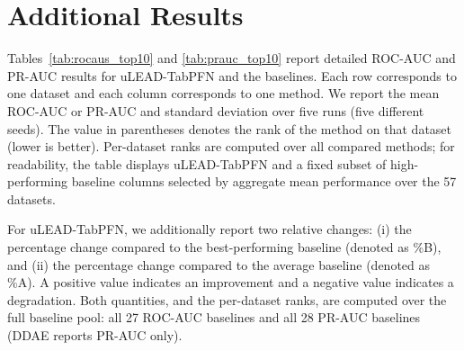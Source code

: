 \documentclass[conference]{IEEEtran}
\begin{document}
	\section{Additional Results}
	\label{app:results}

	Tables~\ref{tab:rocaus_top10} and \ref{tab:prauc_top10} report detailed ROC-AUC and PR-AUC results for uLEAD-TabPFN and the baselines. Each row corresponds to one dataset and each column corresponds to one method. We report the mean ROC-AUC or PR-AUC and standard deviation over five runs (five different seeds). The value in parentheses denotes the rank of the method on that dataset (lower is better). Per-dataset ranks are computed over all compared methods; for readability, the table displays uLEAD-TabPFN and a fixed subset of high-performing baseline columns selected by aggregate mean performance over the 57 datasets.

	For uLEAD-TabPFN, we additionally report two relative changes: (i) the percentage change compared to the best-performing baseline (denoted as \%B), and (ii) the percentage change compared to the average baseline (denoted as \%A). A positive value indicates an improvement and a negative value indicates a degradation. Both quantities, and the per-dataset ranks, are computed over the full baseline pool: all 27 ROC-AUC baselines and all 28 PR-AUC baselines (DDAE reports PR-AUC only).
\end{document}
